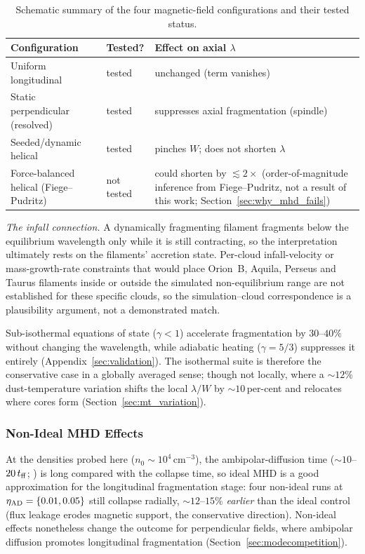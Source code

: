 \documentclass[usenatbib,twoside,twocolumn]{mnras}
\begin{document}
\begin{table}
\caption{Schematic summary of the four magnetic-field configurations and their tested status.}
\label{tab:magcases}
\footnotesize
\setlength{\tabcolsep}{4pt}
\begin{tabular}{@{}p{2.9cm}lp{3.0cm}@{}}
\toprule
Configuration & Tested? & Effect on axial $\lambda$ \\
\midrule
Uniform longitudinal & tested & unchanged (term vanishes) \\
Static perpendicular (resolved) & tested & suppresses axial fragmentation (spindle) \\
Seeded/dynamic helical & tested & pinches $W$; does not shorten $\lambda$ \\
Force-balanced helical (Fiege--Pudritz) & not tested & could shorten by $\lesssim2\times$ (order-of-magnitude inference from Fiege--Pudritz, not a result of this work; Section~\ref{sec:why_mhd_fails}) \\
\bottomrule
\end{tabular}
\end{table}

\emph{The infall connection.} A dynamically fragmenting filament fragments below the equilibrium wavelength only while it is still contracting, so the interpretation ultimately rests on the filaments' accretion state. Per-cloud infall-velocity or mass-growth-rate constraints that would place Orion~B, Aquila, Perseus and Taurus filaments inside or outside the simulated non-equilibrium range are not established for these specific clouds, so the simulation--cloud correspondence is a plausibility argument, not a demonstrated match.

Sub-isothermal equations of state ($\gamma<1$) accelerate fragmentation by $30$--$40\%$ without changing the wavelength, while adiabatic heating ($\gamma=5/3$) suppresses it entirely (Appendix~\ref{sec:validation}). The isothermal suite is therefore the conservative case in a globally averaged sense; though not locally, where a $\sim12\%$ dust-temperature variation shifts the local $\lambda/W$ by $\sim10$\,per-cent and relocates where cores form (Section~\ref{sec:mt_variation}).

\subsubsection{Non-Ideal MHD Effects}
\label{sec:nonideal}

At the densities probed here ($n_0\sim10^4$\,cm$^{-3}$), the ambipolar-diffusion time ($\sim10$--$20\,t_{\rm ff}$; \citealt{Tassis2004}) is long compared with the collapse time, so ideal MHD is a good approximation for the longitudinal fragmentation stage: four non-ideal runs at $\eta_{\rm AD}=\{0.01,0.05\}$ still collapse radially, $\sim12$--$15\%$ \textit{earlier} than the ideal control (flux leakage erodes magnetic support, the conservative direction). Non-ideal effects nonetheless change the outcome for perpendicular fields, where ambipolar diffusion promotes longitudinal fragmentation (Section~\ref{sec:modecompetition}).
\end{document}
